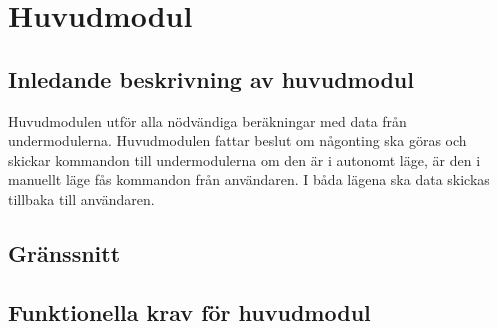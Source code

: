 \section{Huvudmodul}

\subsection{Inledande beskrivning av huvudmodul}
Huvudmodulen utför alla nödvändiga beräkningar med data från undermodulerna. Huvudmodulen fattar beslut om någonting ska göras och skickar kommandon till undermodulerna om den är i autonomt läge, är den i manuellt läge fås kommandon från användaren. I båda lägena ska data skickas tillbaka till användaren.

\subsection{Gränssnitt}
\begin{LIPSkravlista}
\end{LIPSkravlista}

\subsection{Funktionella krav för huvudmodul}	
\begin{LIPSkravlista}
\end{LIPSkravlista}
